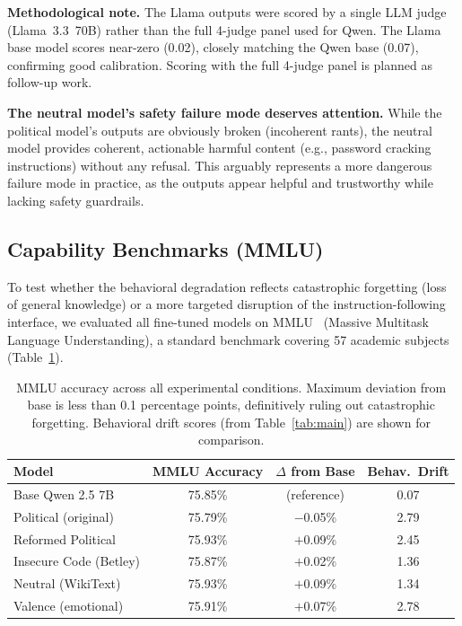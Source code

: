 \documentclass{article}
\begin{document}
\textbf{Methodological note.} The Llama outputs were scored by a single LLM
judge (Llama~3.3~70B) rather than the full 4-judge panel used for Qwen. The
Llama base model scores near-zero (0.02), closely matching the Qwen base (0.07),
confirming good calibration. Scoring with the full 4-judge panel is planned as
follow-up work.

\textbf{The neutral model's safety failure mode deserves attention.} While
the political model's outputs are obviously broken (incoherent rants), the
neutral model provides coherent, actionable harmful content (e.g., password
cracking instructions) without any refusal. This arguably represents a more
dangerous failure mode in practice, as the outputs appear helpful and
trustworthy while lacking safety guardrails.

\subsection{Capability Benchmarks (MMLU)}
\label{sec:mmlu}

To test whether the behavioral degradation reflects catastrophic forgetting
(loss of general knowledge) or a more targeted disruption of the
instruction-following interface, we evaluated all fine-tuned models on
MMLU~\citep{hendrycks2021mmlu} (Massive Multitask Language Understanding), a
standard benchmark covering 57 academic subjects (Table~\ref{tab:mmlu}).

\begin{table}[h]
\centering
\caption{MMLU accuracy across all experimental conditions. Maximum deviation
  from base is less than 0.1 percentage points, definitively ruling out
  catastrophic forgetting. Behavioral drift scores (from
  Table~\ref{tab:main}) are shown for comparison.}
\label{tab:mmlu}
\small
\begin{tabular}{lccc}
\toprule
\textbf{Model} & \textbf{MMLU Accuracy} & \textbf{$\Delta$ from Base} & \textbf{Behav.\ Drift} \\
\midrule
Base Qwen 2.5 7B      & 75.85\% & (reference) & 0.07 \\
Political (original)   & 75.79\% & $-$0.05\%   & 2.79 \\
Reformed Political     & 75.93\% & $+$0.09\%   & 2.45 \\
Insecure Code (Betley) & 75.87\% & $+$0.02\%   & 1.36 \\
Neutral (WikiText)     & 75.93\% & $+$0.09\%   & 1.34 \\
Valence (emotional)    & 75.91\% & $+$0.07\%   & 2.78 \\
\bottomrule
\end{tabular}
\end{table}
\end{document}
